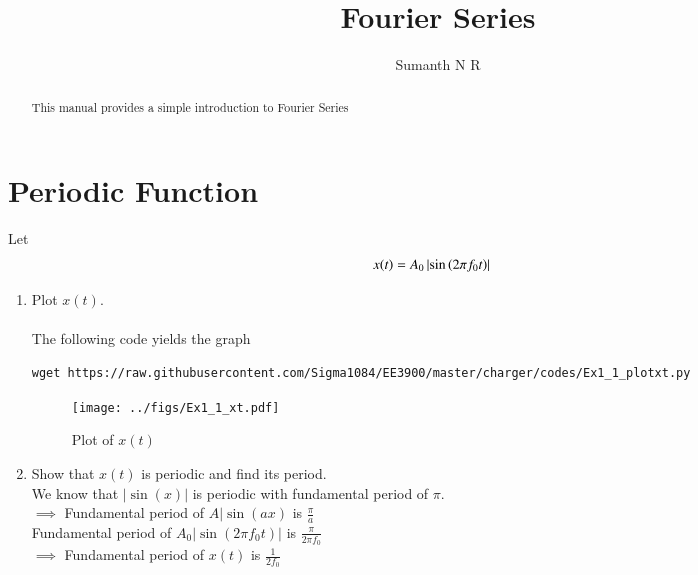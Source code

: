 \documentclass[journal,12pt,twocolumn]{IEEEtran}
\renewcommand\thesection{\arabic{section}}
\begin{document}
\let\StandardTheFigure\thefigure
\renewcommand{\thefigure}{\theproblem}

\def\putbox#1#2#3{\makebox[0in][l]{\makebox[#1][l]{}\raisebox{\baselineskip}[0in][0in]{\raisebox{#2}[0in][0in]{#3}}}}
     \def\rightbox#1{\makebox[0in][r]{#1}}
     \def\centbox#1{\makebox[0in]{#1}}
     \def\topbox#1{\raisebox{-\baselineskip}[0in][0in]{#1}}
     \def\midbox#1{\raisebox{-0.5\baselineskip}[0in][0in]{#1}}

\vspace{3cm}

\title{Fourier Series}
\author{Sumanth N R}
\maketitle
\tableofcontents

\renewcommand{\thefigure}{\theenumi}
\renewcommand{\thetable}{\theenumi}

\bigskip

\begin{abstract}
This manual provides a simple introduction to Fourier Series
\end{abstract}


\section{Periodic Function}
Let 
\begin{align}
	x(t) &= A_0\left\vert\sin\left(2\pi f_0 t\right)\right\vert
	\label{eq:10-orig-diff-def}
\end{align}

\begin{enumerate}[label=\thesection.\arabic*, ref=\thesection.\theenumi]

\item Plot $x(t)$. \\
	\solution\\
	The following code yields the graph
	\begin{lstlisting}
wget https://raw.githubusercontent.com/Sigma1084/EE3900/master/charger/codes/Ex1_1_plotxt.py
	\end{lstlisting}
	\begin{figure}[!htp]
		\texttt{[image: ../figs/Ex1\_1\_xt.pdf]}
		\caption{Plot of $x(t)$}
		\label{fig:x-t}
	\end{figure}


\item Show that $x(t)$ is periodic and find its period.
	\solution\\
	We know that \( |\sin(x)| \) is periodic with fundamental period of \( \pi \). \\
	\( \implies \) Fundamental period of \( A|\sin(ax) \) is \( \frac{\pi}{a} \) \\
	Fundamental period of \( A_0|\sin(2\pi f_0t)| \) is \( \frac{\pi}{2\pi f_0} \) \\
	\( \implies \) Fundamental period of \( x(t) \) is \( \frac{1}{2f_0} \)
	

\end{enumerate}
\end{document}
